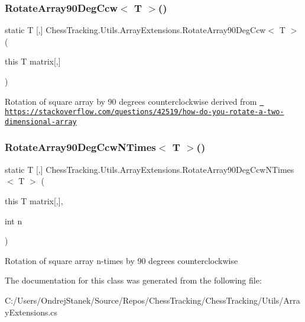 \subsubsection{\texorpdfstring{RotateArray90DegCcw$<$ T $>$()}{RotateArray90DegCcw< T >()}}
{\footnotesize\ttfamily static T \mbox{[},\mbox{]} Chess\+Tracking.\+Utils.\+Array\+Extensions.\+Rotate\+Array90\+Deg\+Ccw$<$ T $>$ (\begin{DoxyParamCaption}\item[{this T}]{matrix\mbox{[},\mbox{]} }\end{DoxyParamCaption})\hspace{0.3cm}{\ttfamily [static]}}



Rotation of square array by 90 degrees counterclockwise derived from \href{https://stackoverflow.com/questions/42519/how-do-you-rotate-a-two-dimensional-array}{\texttt{ https\+://stackoverflow.\+com/questions/42519/how-\/do-\/you-\/rotate-\/a-\/two-\/dimensional-\/array}} 

\mbox{\label{class_chess_tracking_1_1_utils_1_1_array_extensions_a0037fa8dad6fbbcb44c28d225688bbe8}} 
\subsubsection{\texorpdfstring{RotateArray90DegCcwNTimes$<$ T $>$()}{RotateArray90DegCcwNTimes< T >()}}
{\footnotesize\ttfamily static T \mbox{[},\mbox{]} Chess\+Tracking.\+Utils.\+Array\+Extensions.\+Rotate\+Array90\+Deg\+Ccw\+N\+Times$<$ T $>$ (\begin{DoxyParamCaption}\item[{this T}]{matrix\mbox{[},\mbox{]},  }\item[{int}]{n }\end{DoxyParamCaption})\hspace{0.3cm}{\ttfamily [static]}}



Rotation of square array n-\/times by 90 degrees counterclockwise 



The documentation for this class was generated from the following file\+:\begin{DoxyCompactItemize}
\item 
C\+:/\+Users/\+Ondrej\+Stanek/\+Source/\+Repos/\+Chess\+Tracking/\+Chess\+Tracking/\+Utils/Array\+Extensions.\+cs\end{DoxyCompactItemize}
